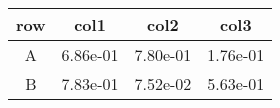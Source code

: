 \begin{tabular}{cccc}
\toprule
row&col1&col2&col3\tabularnewline
\midrule
A&6.86e-01&7.80e-01&1.76e-01\tabularnewline
B&7.83e-01&7.52e-02&5.63e-01\tabularnewline
\bottomrule
\end{tabular}
